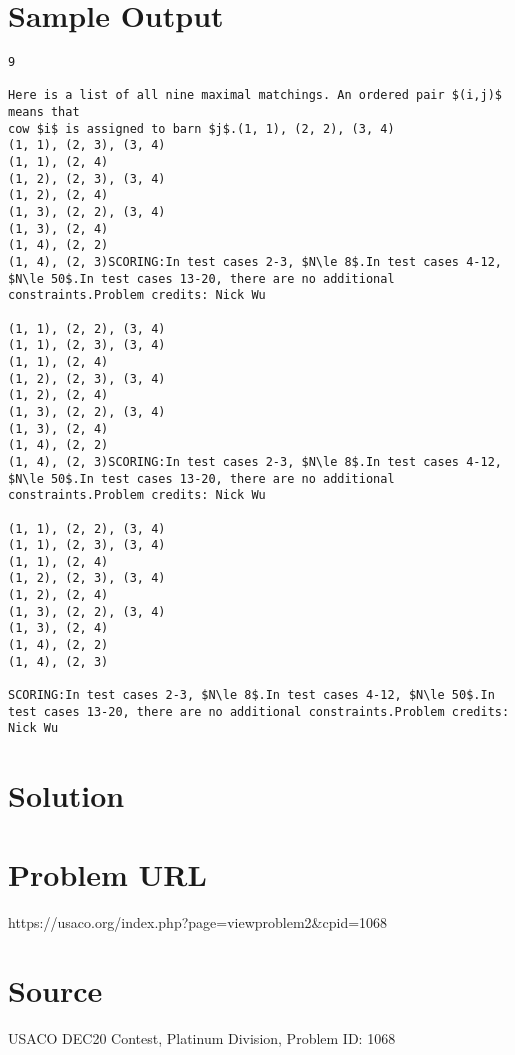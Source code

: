 \documentclass[12pt]{article}
\begin{document}
\section*{Sample Output}
\begin{verbatim}
9

Here is a list of all nine maximal matchings. An ordered pair $(i,j)$ means that
cow $i$ is assigned to barn $j$.(1, 1), (2, 2), (3, 4)
(1, 1), (2, 3), (3, 4)
(1, 1), (2, 4)
(1, 2), (2, 3), (3, 4)
(1, 2), (2, 4)
(1, 3), (2, 2), (3, 4)
(1, 3), (2, 4)
(1, 4), (2, 2)
(1, 4), (2, 3)SCORING:In test cases 2-3, $N\le 8$.In test cases 4-12, $N\le 50$.In test cases 13-20, there are no additional constraints.Problem credits: Nick Wu

(1, 1), (2, 2), (3, 4)
(1, 1), (2, 3), (3, 4)
(1, 1), (2, 4)
(1, 2), (2, 3), (3, 4)
(1, 2), (2, 4)
(1, 3), (2, 2), (3, 4)
(1, 3), (2, 4)
(1, 4), (2, 2)
(1, 4), (2, 3)SCORING:In test cases 2-3, $N\le 8$.In test cases 4-12, $N\le 50$.In test cases 13-20, there are no additional constraints.Problem credits: Nick Wu

(1, 1), (2, 2), (3, 4)
(1, 1), (2, 3), (3, 4)
(1, 1), (2, 4)
(1, 2), (2, 3), (3, 4)
(1, 2), (2, 4)
(1, 3), (2, 2), (3, 4)
(1, 3), (2, 4)
(1, 4), (2, 2)
(1, 4), (2, 3)

SCORING:In test cases 2-3, $N\le 8$.In test cases 4-12, $N\le 50$.In test cases 13-20, there are no additional constraints.Problem credits: Nick Wu
\end{verbatim}

\section*{Solution}


\section*{Problem URL}
https://usaco.org/index.php?page=viewproblem2&cpid=1068

\section*{Source}
USACO DEC20 Contest, Platinum Division, Problem ID: 1068
\end{document}
